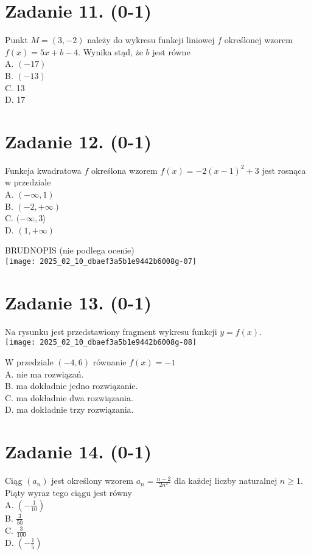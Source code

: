 \documentclass[10pt]{article}
\begin{document}
\section*{Zadanie 11. (0-1)}
Punkt \(M=(3,-2)\) należy do wykresu funkcji liniowej \(f\) określonej wzorem \(f(x)=5 x+b-4\). Wynika stąd, że \(b\) jest równe\\
A. \((-17)\)\\
B. \((-13)\)\\
C. 13\\
D. 17

\section*{Zadanie 12. (0-1)}
Funkcja kwadratowa \(f\) określona wzorem \(f(x)=-2(x-1)^{2}+3\) jest rosnąca w przedziale\\
A. \((-\infty, 1)\)\\
B. \((-2,+\infty)\)\\
C. \((-\infty, 3\rangle\)\\
D. \((1,+\infty)\)

BRUDNOPIS (nie podlega ocenie)\\
\texttt{[image: 2025\_02\_10\_dbaef3a5b1e9442b6008g-07]}

\section*{Zadanie 13. (0-1)}
Na rysunku jest przedstawiony fragment wykresu funkcji \(y=f(x)\).\\
\texttt{[image: 2025\_02\_10\_dbaef3a5b1e9442b6008g-08]}

W przedziale \((-4,6)\) równanie \(f(x)=-1\)\\
A. nie ma rozwiązań.\\
B. ma dokładnie jedno rozwiązanie.\\
C. ma dokładnie dwa rozwiązania.\\
D. ma dokładnie trzy rozwiązania.

\section*{Zadanie 14. (0-1)}
Ciąg \(\left(a_{n}\right)\) jest określony wzorem \(a_{n}=\frac{n-2}{2 n^{2}}\) dla każdej liczby naturalnej \(n \geq 1\). Piąty wyraz tego ciągu jest równy\\
A. \(\left(-\frac{1}{10}\right)\)\\
B. \(\frac{3}{50}\)\\
C. \(\frac{3}{100}\)\\
D. \(\left(-\frac{1}{5}\right)\)
\end{document}
